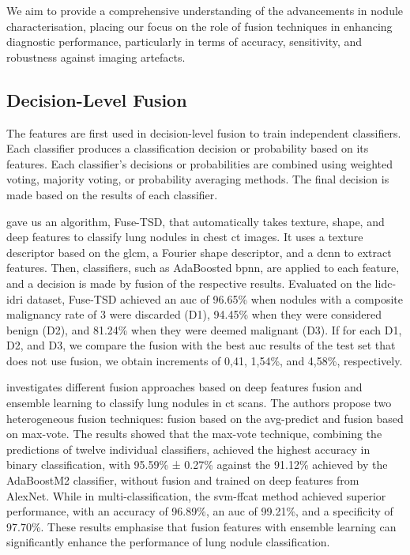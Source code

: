 We aim to provide a comprehensive understanding of the advancements in nodule characterisation, placing our focus on the role of fusion techniques in enhancing diagnostic performance, particularly in terms of accuracy, sensitivity, and robustness against imaging artefacts.


\subsection{Decision-Level Fusion}
The features are first used in decision-level fusion to train independent classifiers. Each classifier produces a classification decision or probability based on its features.
Each classifier's decisions or probabilities are combined using weighted voting, majority voting, or probability averaging methods.
The final decision is made based on the results of each classifier.

\textcite{xie_fusing_2018} gave us an algorithm, Fuse-TSD, that automatically takes texture, shape, and deep features to classify lung nodules in chest \ac{ct} images. It uses a texture descriptor based on the \ac{glcm}, a Fourier shape descriptor, and a \ac{dcnn} to extract features. Then, classifiers, such as AdaBoosted \ac{bpnn}, are applied to each feature, and a decision is made by fusion of the respective results. Evaluated on the \ac{lidc-idri} dataset, Fuse-TSD achieved an \ac{auc} of 96.65\% when nodules with a composite malignancy rate of 3 were discarded (D1), 94.45\% when they were considered benign (D2), and 81.24\% when they were deemed malignant (D3). If for each D1, D2, and D3, we compare the fusion with the best \ac{auc} results of the test set that does not use fusion, we obtain increments of 0,41, 1,54\%, and 4,58\%, respectively.

\textcite{muzammil_pulmonary_2021} investigates different fusion approaches based on deep features fusion and ensemble learning to classify lung nodules in \ac{ct} scans. The authors propose two heterogeneous fusion techniques: fusion based on the \ac{avg-predict} and fusion based on \ac{max-vote}. The results showed that the \ac{max-vote} technique, combining the predictions of twelve individual classifiers, achieved the highest accuracy in binary classification, with 95.59\% ± 0.27\% against the 91.12\% achieved by the AdaBoostM2 classifier, without fusion and trained on deep features from AlexNet. While in multi-classification, the \ac{svm-ffcat} method achieved superior performance, with an accuracy of 96.89\%, an \ac{auc} of 99.21\%, and a specificity of 97.70\%. These results emphasise that fusion features with ensemble learning can significantly enhance the performance of lung nodule classification.

